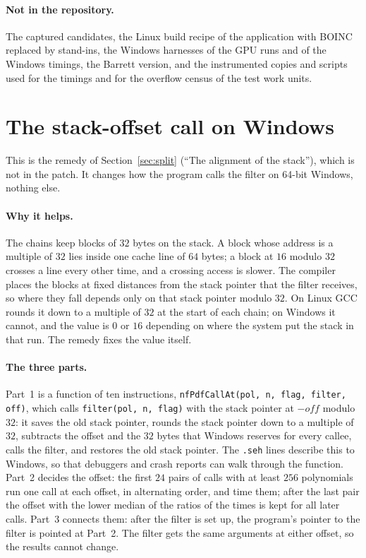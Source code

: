 \documentclass[10pt,a4paper]{article}
\newcommand{\code}[1]{\texttt{#1}}
\theoremstyle{plain}
\theoremstyle{definition}
\begin{document}
\paragraph{Not in the repository.}  The captured candidates, the Linux build recipe of the application with BOINC replaced by stand-ins, the Windows harnesses of the
GPU runs and of the Windows timings, the Barrett version, and the instrumented copies and scripts used for the timings and for the overflow census of the test work
units.

\section{The stack-offset call on Windows}\label{app:stack}

This is the remedy of Section~\ref{sec:split} (``The alignment of the stack''), which is not in the patch.  It changes how the program calls the filter on
64-bit Windows, nothing else.

\paragraph{Why it helps.}  The chains keep blocks of $32$ bytes on the stack.  A block whose address is a multiple of $32$ lies inside one cache line of $64$ bytes;
a block at $16$ modulo $32$ crosses a line every other time, and a crossing access is slower.  The compiler places the blocks at fixed distances from the stack
pointer that the filter receives, so where they fall depends only on that stack pointer modulo $32$.  On Linux GCC rounds it down to a multiple of $32$ at the
start of each chain; on Windows it cannot, and the value is $0$ or $16$ depending on where the system put the stack in that run.  The remedy fixes the value
itself.

\paragraph{The three parts.}  Part~1 is a function of ten instructions, \code{nfPdfCallAt(pol, n, flag, filter, off)}, which calls
\code{filter(pol, n, flag)} with the stack pointer at $-\mathit{off}$ modulo $32$: it saves the old stack pointer, rounds the stack pointer down to a multiple of
$32$, subtracts the offset and the $32$ bytes that Windows reserves for every callee, calls the filter, and restores the old stack pointer.  The \code{.seh}
lines describe this to Windows, so that debuggers and crash reports can walk through the function.  Part~2 decides the offset: the first $24$ pairs of calls with at
least $256$ polynomials run one call at each offset, in alternating order, and time them; after the last pair the offset with the lower median of the ratios of
the times is kept for all later calls.  Part~3 connects them: after the filter is set up, the program's pointer to the filter is pointed at Part~2.  The filter
gets the same arguments at either offset, so the results cannot change.
\end{document}
